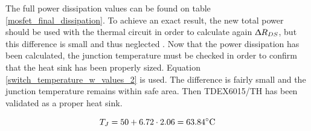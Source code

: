 The full power dissipation values can be found on table \ref{mosfet_final_dissipation}. To achieve an exact result, the new total power should be used with the thermal circuit in order to calculate again $\Updelta R_{DS}$, but this difference is small and thus neglected . Now that the power dissipation has been calculated, the junction temperature must be checked in order to confirm that the heat sink has been properly sized. Equation \ref{switch_temperature_w_values_2} is used. The difference is fairly small and the junction temperature remains within safe area. Then TDEX6015/TH has been validated as a proper heat sink.

\begin{equation} \label{switch_temperature_w_values_2}
T_{J} = 50 + 6.72 \cdot  2.06 = 63.84 \decC
\end{equation}



